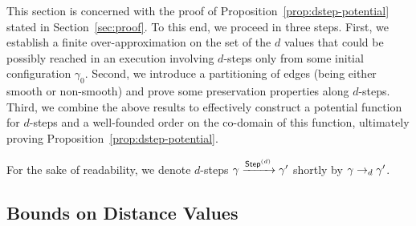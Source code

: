 
This section is concerned with the proof of
Proposition~\ref{prop:dstep-potential} stated in
Section~\ref{sec:proof}. To this end, we proceed in three steps.
First, we establish a finite over-approximation on the set of the $d$
values that could be possibly reached in an execution involving
$d$-steps only from some initial configuration $\gamma_0$.
Second, we introduce a
partitioning of edges (being either smooth or non-smooth) and prove
some preservation properties along $d$-steps.
Third, we combine the above results to effectively construct a
potential function for $d$-steps and a well-founded order on the
co-domain of this function, ultimately proving
Proposition~\ref{prop:dstep-potential}.

For the sake of readability, we denote $d$-steps $\gamma \xrightarrow{\mathsf{Step}^{(d)}}
\gamma'$ shortly by $\gamma \rightarrow_d \gamma'$.

\subsection{Bounds on Distance Values}
\label{sec:dstep-potential:bounds}

